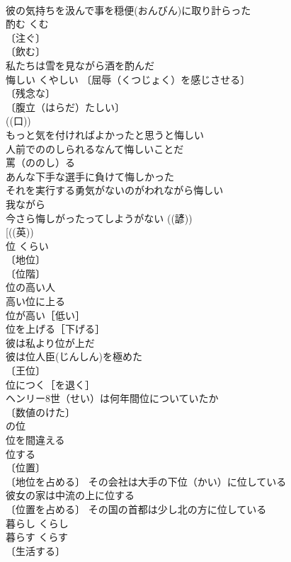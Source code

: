 \documentclass[8pt]{extreport}
\begin{document}
\begin{CJK}{UTF8}{min}
\\	彼の気持ちを汲んで事を穏便(おんびん)に取り計らった 
\\	酌む	くむ	
\\	〔注ぐ〕
\\	〔飲む〕
\\	私たちは雪を見ながら酒を酌んだ 
\\	悔しい	くやしい	〔屈辱（くつじょく）を感じさせる〕
\\	〔残念な〕
\\	〔腹立（はらだ）たしい〕
\\	((口)) 
\\	もっと気を付ければよかったと思うと悔しい 
\\	人前でののしられるなんて悔しいことだ 
\\	罵（ののし）る　
\\	あんな下手な選手に負けて悔しかった 
\\	それを実行する勇気がないのがわれながら悔しい 
\\	我ながら 
\\	今さら悔しがったってしようがない ((諺)) 
\\	[((英)) 
\\	位	くらい	
\\	〔地位〕
\\	〔位階〕
\\	位の高い人 
\\	高い位に上る 
\\	位が高い［低い］ 
\\	位を上げる［下げる］ 
\\	彼は私より位が上だ 
\\	彼は位人臣(じんしん)を極めた 
\\	〔王位〕
\\	位につく［を退く］ 
\\	ヘンリー8世（せい）は何年間位についていたか 
\\	〔数値のけた〕 
\\	の位 
\\	位を間違える 
\\	位する 
\\	〔位置〕 
\\	〔地位を占める〕 その会社は大手の下位（かい）に位している 
\\	彼女の家は中流の上に位する 
\\	〔位置を占める〕 その国の首都は少し北の方に位している 
\\	暮らし	くらし	
\\	暮らす	くらす	
\\	〔生活する〕

\end{CJK}
\end{document}
